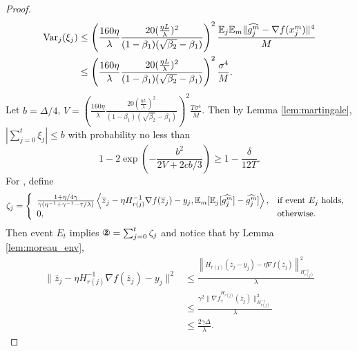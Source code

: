 \documentclass{article} %
\numberwithin{equation}{section}
\newcommand{\cirtwo}{\text{\ding{173}}}
\begin{document}
\begin{proof}
\begin{equation}
    \end{equation}
    \begin{equation}
        \begin{aligned}
            \mathrm{Var}_j(\xi_j) 
            &\leq \left(\frac{160\eta}{\lambda}\frac{20(\frac{\eta L}{\lambda})^2}{(1-\beta_1)(\sqrt{\beta_2}-\beta_1)}\right)^2\frac{\mathbb{E}_j\mathbb{E}_m \|\widehat{g_j^m}-\nabla f(x_j^m)\|^4}{M} \\
            &\leq \left(\frac{160\eta}{\lambda}\frac{20(\frac{\eta L}{\lambda})^2}{(1-\beta_1)(\sqrt{\beta_2}-\beta_1)}\right)^2\frac{\sigma^4}{M}.
        \end{aligned}
    \end{equation}
    Let $b=\Delta/4$, $V=\left(\frac{160\eta}{\lambda}\frac{20(\frac{\eta L}{\lambda})^2}{(1-\beta_1)(\sqrt{\beta_2}-\beta_1)}\right)^2\frac{T\sigma^4}{M}$. Then by Lemma \ref{lem:martingale}, $|\sum_{j=0}^t\xi_j|\leq b$ with probability no less than
    \begin{equation}
        1 - 2\exp{\left(-\frac{b^2}{2V+2cb/3}\right)} \geq 1-\frac{\delta}{12T}.
    \end{equation}
        For \cirtwo, define
    \begin{equation}
        \zeta_j=\left\{
            \begin{array}{ll}
                \frac{1+\eta/4\gamma}{\gamma(\eta^{-1} +\gamma^{-1}-\tau/\lambda)} \left\langle \overline{z}_{j}-\eta H_{r(j)}^{-1}\nabla f(\overline{z}_j)-y_j, \mathbb{E}_m[\mathbb{E}_j[\widehat{g_j^m}]-\widehat{g_j^m}]\right\rangle, & \text{if event $E_j$ holds, } \\
                0 ,& \text{otherwise.}
            \end{array}
        \right.
    \end{equation}
    Then event $E_t$ implies $\cirtwo=\sum_{j=0}^t\zeta_j$ and notice that by Lemma \ref{lem:moreau_env},
    \begin{equation}
        \begin{aligned}
            \|\overline{z}_{j}-\eta H_{r(j)}^{-1}\nabla f(\overline{z}_j)-y_j\|^2
            &\leq \frac{\left\|H_{r(j)}(\overline{z}_j-y_j)-\eta\nabla f(\overline{z}_j)\right\|_{H_{r(j)}^{-1}}^2}{\lambda} \\
            &\leq \frac{\gamma^2\|\nabla f_\gamma^{H_{r(j)}}(\overline{z}_j)\|_{H_{r(j)}^{-1}}^2}{\lambda} \\
            &\leq \frac{2\gamma \Delta}{\lambda}.
        \end{aligned}
    \end{equation}

\end{proof}
\end{document}
